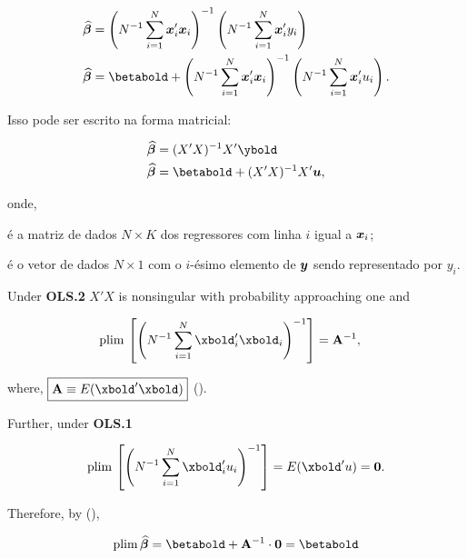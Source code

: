 \documentclass[11pt, oneside, a4paper, article]{article}
\numberwithin{equation}{section}
\begin{document}
\vspace{-1 em}
\begin{align*}
\betahatbold &=
\left( N^{-1} \sum_{i=1}^{N} \mbs{x}_{i}' \mbs{x}_{i} \right)^{-1} 
\left( N^{-1} \sum_{i=1}^{N} \mbs{x}_{i}' y_{i} \right)
\\
\betahatbold &=
\betabold +
\left( N^{-1} \sum_{i=1}^{N} \mbs{x}_{i}' \mbs{x}_{i} \right)^{-1} 
\left( N^{-1} \sum_{i=1}^{N} \mbs{x}_{i}' u_{i} \right).
\end{align*}

\noindent
Isso pode ser escrito na forma matricial:

\vspace{-1 em}
\begin{align*}
\betahatbold &=	(X'X)^{-1} X'\ybold
\\
\betahatbold &=	\betabold + (X'X)^{-1} X'\ubold ,
\end{align*}

\noindent onde,

\vspace{-1 ex}
\begin{description}[noitemsep]
\item[$X$] é a matriz de dados $N \times K$ dos regressores com linha $i$ igual a $\boldsymbol{x}_{i}$;

\item[$\ybold$] é o vetor de dados $N \times 1$ com o $i$-ésimo elemento de $\boldsymbol{y}$ sendo representado por $y_{i}$.
\end{description}

Under \textbf{OLS.2} $X'X$ is nonsingular with probability approaching one and

\begin{align*}
\plim \left[ \left( N^{-1} \sum_{i=1}^{N} \xbold_{i}' \xbold_{i} \right)^{-1} \right] 
&= \Abold^{-1},
\end{align*}

\noindent where,
$\boxed{\Abold \equiv E(\xbold' \xbold)}$ ().

Further, under \textbf{OLS.1}

\begin{align*}
\plim \left[ \left( N^{-1} \sum_{i=1}^{N} \xbold_{i}' u_{i} \right)^{-1} \right]
= E(\xbold'u) = \mbs{0}.
\end{align*}

Therefore, by  (), 

\begin{align*}
	\plim \betahatbold = \betabold + \Abold^{-1} \cdot \mbs{0} = \betabold
\end{align*}
\end{document}
